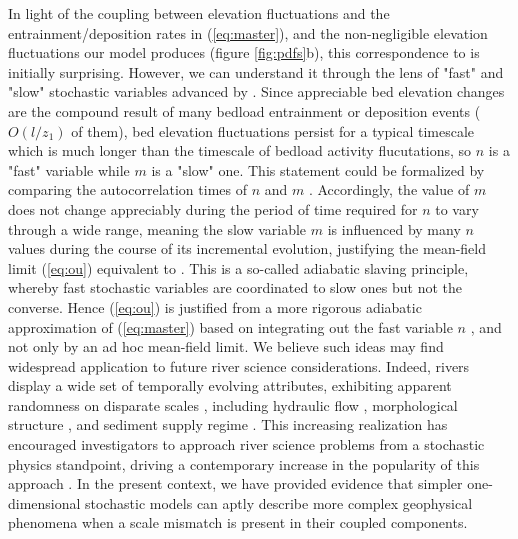 \documentclass[draft]{agujournal2018}
\begin{document}
In light of the coupling between elevation fluctuations and the entrainment/deposition rates in (\ref{eq:master}), and the non-negligible elevation fluctuations our model produces (figure \ref{fig:pdfs}b), this correspondence to \citet{Martin2014} is initially surprising.
However, we can understand it through the lens of "fast" and "slow" stochastic variables advanced by \citet{Haken1983}.
Since appreciable bed elevation changes are the compound result of many bedload entrainment or deposition events ($O(l/z_1)$ of them), bed elevation fluctuations persist for a typical timescale which is much longer than the timescale of bedload activity flucutations, so $n$ is a "fast" variable while $m$ is a "slow" one.
This statement could be formalized by comparing the autocorrelation times of $n$ and $m$ \citep[e.g.][]{Gardiner1983}.
Accordingly, the value of $m$ does not change appreciably during the period of time required for $n$ to vary through a wide range, meaning the slow variable $m$ is influenced by many $n$ values during the course of its incremental evolution, justifying the mean-field limit (\ref{eq:ou}) equivalent to \citet{Martin2014}.
This is a so-called adiabatic slaving principle, whereby fast stochastic variables are coordinated to slow ones but not the converse.
Hence (\ref{eq:ou}) is justified from a more rigorous adiabatic approximation of (\ref{eq:master}) based on integrating out the fast variable $n$ \citep[e.g.][]{Haken1983,Gardiner1983}, and not only by an ad hoc mean-field limit.
We believe such ideas may find widespread application to future river science considerations.
Indeed, rivers display a wide set of temporally evolving attributes, exhibiting apparent randomness on disparate scales \citep{Chartrand2019}, including hydraulic flow \citep[e.g.][]{Ferrer-Boix2015}, morphological structure \citep[e.g.][]{Dhont2018}, and sediment supply regime \citep[e.g.][]{Elgueta-Astaburuaga2019}.
This increasing realization has encouraged investigators to approach river science problems from a stochastic physics standpoint, driving a contemporary increase in the popularity of this approach \citep[e.g][]{Ancey2008,Furbish2012}.
In the present context, we have provided evidence that simpler one-dimensional stochastic models \citep[e.g.][]{Martin2014} can aptly describe more complex geophysical phenomena when a scale mismatch is present in their coupled components.
\end{document}
